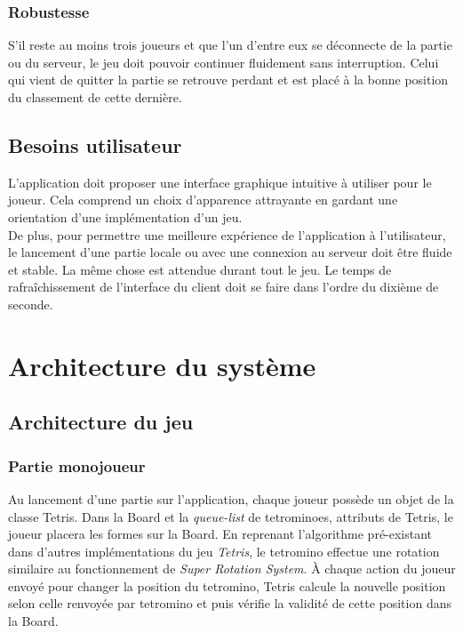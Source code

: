 \documentclass{article}
\begin{document}
\subsubsection{Robustesse}

S'il reste au moins trois joueurs et que l'un d'entre eux se déconnecte de la partie ou du serveur, le jeu doit pouvoir continuer fluidement sans interruption. Celui qui vient de quitter la partie se retrouve perdant et est placé à la bonne position du classement de cette dernière.

\subsection{Besoins utilisateur}

L'application doit proposer une interface graphique intuitive à utiliser pour le joueur. Cela comprend un choix d'apparence attrayante en gardant une orientation d'une implémentation d'un jeu.\\
 De plus, pour permettre une meilleure expérience de l'application à l'utilisateur, le lancement d'une partie locale ou avec une connexion au serveur doit être fluide et stable. La même chose est attendue durant tout le jeu. Le temps de rafraîchissement de l'interface du client doit se faire dans l'ordre du dixième de seconde.

\newpage

\section{Architecture du système}

\subsection{Architecture du jeu}

\subsubsection{Partie monojoueur}

Au lancement d'une partie sur l'application, chaque joueur possède un objet de la classe Tetris. Dans la Board et la \textit{queue-list} de tetrominoes, attributs de Tetris, le joueur placera les formes sur la Board. En reprenant l'algorithme pré-existant dans d'autres implémentations du jeu \textit{Tetris}, le tetromino effectue une rotation similaire au fonctionnement de \textit{Super Rotation System}. À chaque action du joueur envoyé pour changer la position du tetromino, Tetris calcule la nouvelle position selon celle renvoyée par tetromino et puis vérifie la validité de cette position dans la Board. 
\end{document}
